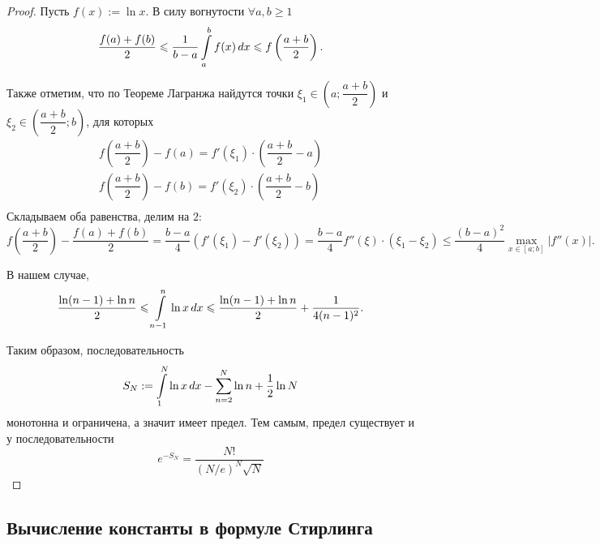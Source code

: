 \documentclass[a4paper]{article}
\theoremstyle{named}
\renewcommand{\int}{\intop}
\begin{document}
   		\begin{proof}
   			Пусть $f(x) := \ln x$. В силу вогнутости $\forall a, b \geq 1$
   			\begin{equation*}
   				\dfrac{f(a) + f(b)}{2} \leq \dfrac{1}{b - a} \int_a^b f(x) \dd x \leq f\left(\dfrac{a + b}{2}\right).
   			\end{equation*}

   			Также отметим, что по Теореме Лагранжа найдутся точки $\xi_1 \in \left(a; \dfrac{a + b}{2}\right)$ и $\xi_2 \in \left(\dfrac{a + b}{2}; b\right)$, для которых
   			\[\begin{gathered}
   				f \left(\dfrac{a + b}{2}\right) - f(a) = f'(\xi_1) \cdot \left(\dfrac{a + b}{2} - a\right) \\
   				f \left(\dfrac{a + b}{2}\right) - f(b) = f'(\xi_2) \cdot \left(\dfrac{a + b}{2} - b\right) \\
   			\end{gathered}\]
   			Складываем оба равенства, делим на $2$:
   			\begin{equation*}
   				f \left(\dfrac{a + b}{2}\right) - \dfrac{f(a) + f(b)}{2} = \dfrac{b - a}{4} (f'(\xi_1) - f'(\xi_2)) = \dfrac{b - a}{4} f''(\xi) \cdot (\xi_1 - \xi_2) \leq \dfrac{(b - a)^2}{4} \max\limits_{x \in [a; b]} |f''(x)|.
   			\end{equation*}

   			В нашем случае,
   			\begin{equation*}
   				\dfrac{\ln(n - 1) + \ln n}{2} \leq \int_{n - 1}^n \ln x \dd x \leq \dfrac{\ln( n- 1) + \ln n}{2} + \dfrac{1}{4(n - 1)^2}.
   			\end{equation*}

   			Таким образом, последовательность
   			\begin{equation*}
   				S_N := \int_1^N \ln x \dd x - \sum_{n = 2}^N \ln n + \dfrac{1}{2} \ln N
   			\end{equation*}
   			монотонна и ограничена, а значит имеет предел. Тем самым, предел существует и у последовательности
   			\begin{equation*}
   				e^{-S_N} = \dfrac{N!}{(N / e)^N \sqrt{N}}
   			\end{equation*}
   		\end{proof}

   		\subsection{Вычисление константы в формуле Стирлинга}
\end{document}
